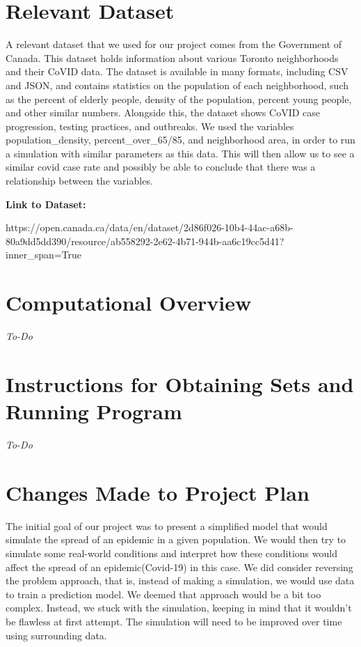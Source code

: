 \documentclass{article}
\begin{document}
\section{Relevant Dataset}

A  relevant  dataset  that we used for our  project  comes
from the Government of Canada.  This dataset holds information about various Toronto neighborhoods and their CoVID data. The dataset is available in many formats,  including  CSV  and  JSON,  and  contains  statistics  on  the  population of  each  neighborhood, such as  the  percent  of  elderly  people, density  of  the population, percent young people, and other similar numbers.  Alongside this, the  dataset  shows  CoVID  case  progression,  testing  practices,  and  outbreaks. We used the variables population\_density, percent\_over\_65/85, and neighborhood area, in order to run a simulation with similar parameters as this data. This will then allow us  to see a similar covid case rate and possibly be able to conclude that there was a relationship between the variables.


\bigskip

\textbf{Link to Dataset:} 

https://open.canada.ca/data/en/dataset/2d86f026-10b4-44ac-a68b-80a9dd5dd390/resource/ab558292-2e62-4b71-944b-aa6c19cc5d41?inner\_span=True

\bigskip


\bigskip


\section{Computational Overview}
\textit{To-Do}
\bigskip


\section{Instructions for Obtaining Sets and Running Program}
\textit{To-Do}
\bigskip

\section{Changes Made to Project Plan}
The initial goal of our project was to present a simplified model that would simulate the spread of an epidemic in a given population. We would then try to simulate some real-world conditions and interpret how these conditions would affect the spread of an epidemic(Covid-19) in this case. We did consider reversing the problem approach, that is, instead of making a simulation, we would use data to train a prediction model. We deemed that approach would be a bit too complex. Instead, we stuck with the simulation, keeping in mind that it wouldn’t be flawless at first attempt. The simulation will need to be improved over time using surrounding data.
\bigskip
\end{document}
